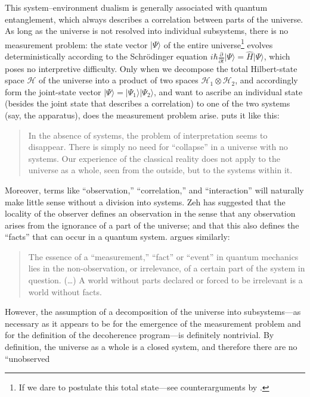 \documentclass[rmp,aps,amsmath,amsfonts,noshowkeys,noshowpacs,12pt]{revtex4}
\newcommand{\ket}[1]{\ensuremath{|{#1\rangle}}}
\begin{document}
This system--environment dualism is generally associated with quantum
entanglement, which always describes a correlation between parts of
the universe. As long as the universe is not resolved into individual
subsystems, there is no measurement problem: the state vector
$\ket{\Psi}$ of the entire universe\footnote{If we dare to postulate
  this total state---see counterarguments by \citet{Auletta:2000:rv}.}
evolves deterministically according to the Schr\"odinger equation
$i\hbar \frac{\partial}{\partial t} \ket{\Psi} = \widehat{H}
\ket{\Psi}$, which poses no interpretive difficulty. Only when we
decompose the total Hilbert-state space $\mathcal{H}$ of the universe
into a product of two spaces $\mathcal{H}_1 \otimes \mathcal{H}_2$,
and accordingly form the joint-state vector
$\ket{\Psi}=\ket{\Psi_1}\ket{\Psi_2}$, and want to ascribe an
individual state (besides the joint state that describes a
correlation) to one of the two systems (say, the apparatus), does the
measurement problem arise.  \citet[p.~718]{Zurek:2002:ii} puts it
like this:
%
\begin{quote} {\small
    In the absence of systems, the problem of interpretation seems to
    disappear.  There is simply no need for ``collapse'' in a universe
    with no systems. Our experience of the classical reality does not
    apply to the universe as a whole, seen from the outside, but to
    the systems within it.}
\end{quote}
%
Moreover, terms like ``observation,'' ``correlation,'' and
``interaction'' will naturally make little sense without a division
into systems. Zeh has suggested that the locality of the observer
defines an observation in the sense that any observation arises from
the ignorance of a part of the universe; and that this also defines
the ``facts'' that can occur in a quantum system.
\citet[pp.~45--46]{Landsman:1995:oi} argues similarly:
%
\begin{quote} {\small 
    The essence of a ``measurement,'' ``fact'' or ``event'' in quantum
    mechanics lies in the non-observation, or irrelevance, of a
    certain part of the system in question. (\dots) A world without
    parts declared or forced to be irrelevant is a world without
    facts.}
\end{quote}
%
However, the assumption of a decomposition of the universe into
subsystems---as necessary as it appears to be for the emergence of the
measurement problem and for the definition of the decoherence
program---is definitely nontrivial. By definition, the universe as a
whole is a closed system, and therefore there are no ``unobserved
\end{document}
